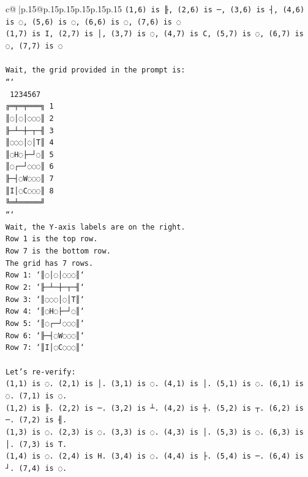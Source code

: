 \documentclass{article}
\begin{document}
{\begin{supertabular}{c@{$\;$}|p{.15\linewidth}@{}p{.15\linewidth}p{.15\linewidth}p{.15\linewidth}p{.15\linewidth}p{.15\linewidth}}
{{{\texttt{(1,6) is ╟, (2,6) is ─, (3,6) is ┤, (4,6) is ◌, (5,6) is ◌, (6,6) is ◌, (7,6) is ◌} \\
\texttt{(1,7) is I, (2,7) is │, (3,7) is ◌, (4,7) is C, (5,7) is ◌, (6,7) is ◌, (7,7) is ◌} \\
\\ 
\texttt{Wait, the grid provided in the prompt is:} \\
\texttt{```} \\
\texttt{ 1234567} \\
\texttt{╔═╤═╤═══╗ 1} \\
\texttt{║◌│◌│◌◌◌║ 2} \\
\texttt{╟─┴─┼─┬─╢ 3} \\
\texttt{║◌◌◌│◌│T║ 4} \\
\texttt{║◌H◌├─┘◌║ 5} \\
\texttt{║◌┌─┘◌◌◌║ 6} \\
\texttt{╟─┤◌W◌◌◌║ 7} \\
\texttt{║I│◌C◌◌◌║ 8} \\
\texttt{╚═╧═════╝} \\
\texttt{```} \\
\texttt{Wait, the Y{-}axis labels are on the right.} \\
\texttt{Row 1 is the top row.} \\
\texttt{Row 7 is the bottom row.} \\
\texttt{The grid has 7 rows.} \\
\texttt{Row 1: `║◌│◌│◌◌◌║`} \\
\texttt{Row 2: `╟─┴─┼─┬─╢`} \\
\texttt{Row 3: `║◌◌◌│◌│T║`} \\
\texttt{Row 4: `║◌H◌├─┘◌║`} \\
\texttt{Row 5: `║◌┌─┘◌◌◌║`} \\
\texttt{Row 6: `╟─┤◌W◌◌◌║`} \\
\texttt{Row 7: `║I│◌C◌◌◌║`} \\
\\ 
\texttt{Let's re{-}verify:} \\
\texttt{(1,1) is ◌. (2,1) is │. (3,1) is ◌. (4,1) is │. (5,1) is ◌. (6,1) is ◌. (7,1) is ◌.} \\
\texttt{(1,2) is ╟. (2,2) is ─. (3,2) is ┴. (4,2) is ┼. (5,2) is ┬. (6,2) is ─. (7,2) is ╢.} \\
\texttt{(1,3) is ◌. (2,3) is ◌. (3,3) is ◌. (4,3) is │. (5,3) is ◌. (6,3) is │. (7,3) is T.} \\
\texttt{(1,4) is ◌. (2,4) is H. (3,4) is ◌. (4,4) is ├. (5,4) is ─. (6,4) is ┘. (7,4) is ◌.} \\
}}}
\end{supertabular}}
\end{document}
